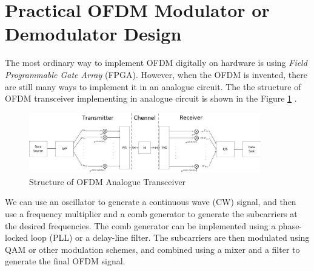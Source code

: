 \documentclass[11pt]{article}
\numberwithin{figure}{section}
\numberwithin{equation}{section}
\begin{document}
\section{Practical OFDM Modulator or Demodulator Design}
The most ordinary way to implement OFDM digitally on hardware is using \textit{Field Programmable Gate Array} (FPGA). However, when the OFDM is invented, there are still many ways to implement it in an analogue circuit. The the structure of OFDM transceiver implementing in analogue circuit is shown in the Figure \ref{fig:Transceiver structure analogue} \cite{RN79}.
\begin{figure}[!h]
    \centering
    \includegraphics[width=0.9\textwidth]{images/OFDM_transceiver_analog.pdf}
    \caption{Structure of OFDM Analogue Transceiver}
    \label{fig:Transceiver structure analogue}
\end{figure}
We can use an oscillator to generate a continuous wave (CW) signal, and then use a frequency multiplier and a comb generator to generate the subcarriers at the desired frequencies. The comb generator can be implemented using a phase-locked loop (PLL) or a delay-line filter. The subcarriers are then modulated using QAM or other modulation schemes, and combined using a mixer and a filter to generate the final OFDM signal.
\end{document}
